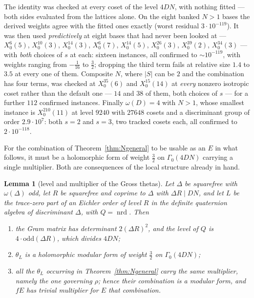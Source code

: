 \documentclass[11pt,reqno]{amsart}
\theoremstyle{plain}
\newtheorem{lemma}[theorem]{Lemma}
\theoremstyle{definition}
\DeclareMathOperator{\nrd}{nrd}
\begin{document}
The identity was checked at every coset of the level $4DN$, with nothing fitted --- both
sides evaluated from the lattices alone. On the eight banked $N>1$ bases the derived
weights agree with the fitted ones exactly (worst residual $3\cdot10^{-119}$). It was then
used \emph{predictively} at eight bases that had never been looked at ---
$X_0^{6}(5)$, $X_0^{10}(3)$, $X_0^{14}(3)$, $X_0^{6}(7)$, $X_0^{14}(5)$, $X_0^{26}(3)$,
$X_0^{39}(2)$, $X_0^{34}(3)$ --- with \emph{both} choices of $s$ at each: sixteen
instances, all confirmed to $\sim10^{-119}$, with weights ranging from $-\tfrac1{16}$ to
$\tfrac32$; dropping the third term fails at relative size $1.4$ to $3.5$ at every one of
them. Composite $N$, where $\lvert S\rvert$ can be $2$ and the combination has four terms,
was checked at $X_0^{35}(6)$ and $X_0^{15}(14)$ at \emph{every} nonzero isotropic coset
rather than the default one --- $14$ and $38$ of them, both choices of $s$ --- for a
further $112$ confirmed instances. Finally $\omega(D)=4$ with $N>1$, whose smallest
instance is $X_0^{210}(11)$ at level $9240$ with $27648$ cosets and a discriminant group
of order $2.9\cdot10^7$: both $s=2$ and $s=3$, two tracked cosets each, all confirmed to
$2\cdot10^{-118}$.

For the combination of Theorem~\ref{thm:Ngeneral} to be usable as an $E$ in what follows,
it must be a holomorphic form of weight $\tfrac32$ on $\Gamma_0(4DN)$ carrying a single
multiplier. Both are consequences of the local structure already in hand.

\begin{lemma}[level and multiplier of the Gross thetas]\label{lem:levelchar}
Let $\Delta$ be squarefree with $\omega(\Delta)$ odd, let $R$ be squarefree and coprime to
$\Delta$ with $\Delta R\mid DN$, and let $L$ be the trace-zero part of an Eichler order of
level $R$ in the definite quaternion algebra of discriminant $\Delta$, with $Q=\nrd$. Then
\begin{enumerate}
\item[(i)] the Gram matrix has determinant $2(\Delta R)^2$, and the level of $Q$ is
      $4\cdot\mathrm{odd}(\Delta R)$, which divides $4DN$;
\item[(ii)] $\theta_L$ is a holomorphic modular form of weight $\tfrac32$ on
      $\Gamma_0(4DN)$;
\item[(iii)] all the $\theta_L$ occurring in Theorem~\ref{thm:Ngeneral} carry the same
      multiplier, namely the one governing $\rho$; hence their combination is a modular
      form, and $fE$ has trivial multiplier for $E$ that combination.
\end{enumerate}
\end{lemma}
\end{document}
